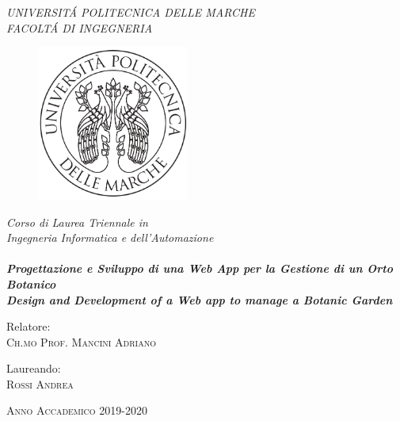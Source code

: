 \documentclass[a4paper,twoside,12pt]{book}
\begin{document}
\pagestyle{fancy}
\renewcommand{\chaptermark}[1]{\markboth{#1}{}}
\renewcommand{\sectionmark}[1]{\markright{\thesection\ #1}}
\fancyhf{} \fancyhead[LE,RO]{\bfseries\thepage}
\fancyhead[LO]{\bfseries\rightmark}
\fancyhead[RE]{\bfseries\leftmark}
\renewcommand{\headrulewidth}{0.5pt}
\renewcommand{\footrulewidth}{0pt}
\fancypagestyle{plain}{
\fancyhead{}
\renewcommand{\headrulewidth}{0pt}}

\thispagestyle{empty}

\begin{center}
  \large
  \textit{UNIVERSIT\'A POLITECNICA DELLE MARCHE\\}
  \vspace*{.5cm}
  \textit{ FACOLT\'A DI INGEGNERIA \\}    
\end{center}
\begin{figure}[h]
	\centering
	\includegraphics[width=5cm]{logo.png}
\end{figure}
\begin{center}
  \vspace*{0.5cm} 
  \emph{Corso di Laurea Triennale in\\Ingegneria Informatica e dell'Automazione\\}
	\hfill \\
  \vspace*{.75cm} \large %
  \emph{\textbf{Progettazione e Sviluppo di una Web App per la Gestione di un Orto Botanico}}
  \hfill \\
  \vspace*{.25cm} \large %
  \emph{\textbf{Design and Development of a Web app to manage a Botanic Garden}}
\end{center}
\vspace*{2.0cm} %
\begin{flushleft}
Relatore:\\\textsc{Ch.mo Prof. Mancini Adriano}\\
\end{flushleft}
\vspace*{-2.0cm}
\begin{flushright}
Laureando:\\\textsc{Rossi Andrea}\\      
\end{flushright}
\vspace*{2cm}
\begin{center}
\large{\textsc{Anno Accademico 2019-2020}}
\end{center} \clearpage
\end{document}
